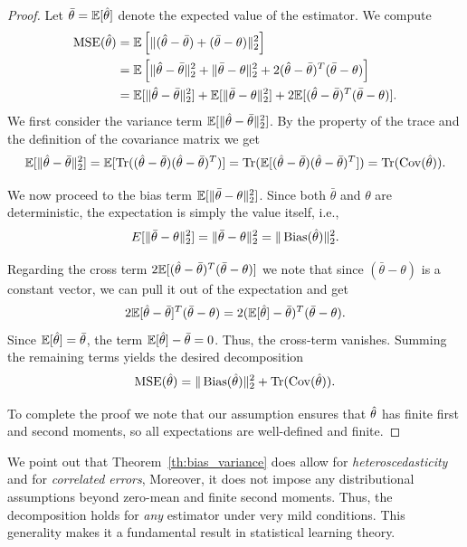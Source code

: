 \begin{proof}
Let $\bar{\theta} = \mathbb{E}[\hat{\theta}]$ denote the expected value of the estimator. We compute
\begin{align*}
\operatorname{MSE}(\hat{\theta}) & = \mathbb{E} \left[ \| (\hat{\theta} - \bar{\theta}) + (\bar{\theta} - \theta) \|_2^2 \right] \\ & = \mathbb{E} \left[ \|\hat{\theta} - \bar{\theta}\|_2^2 + \|\bar{\theta} - \theta\|_2^2 + 2(\hat{\theta} - \bar{\theta})^T (\bar{\theta} - \theta) \right]\\
 & = \mathbb{E} [ \|\hat{\theta} - \bar{\theta}\|_2^2 ] + \mathbb{E} [ \|\bar{\theta} - \theta\|_2^2 ] + 2\mathbb{E} [ (\hat{\theta} - \bar{\theta})^T (\bar{\theta} - \theta) ].
\end{align*}
We first consider the variance term $\mathbb{E} [ \|\hat{\theta} - \bar{\theta}\|_2^2 ]$.
By the property of the trace and the definition of the covariance matrix we get
$$\mathbb{E} [ \|\hat{\theta} - \bar{\theta}\|_2^2 ] = \mathbb{E} [ \operatorname{Tr}((\hat{\theta} - \bar{\theta})(\hat{\theta} - \bar{\theta})^T) ] = \operatorname{Tr}(\mathbb{E} [ (\hat{\theta} - \bar{\theta})(\hat{\theta} - \bar{\theta})^T ]) = \operatorname{Tr}(\operatorname{Cov}(\hat{\theta})).$$


We now proceed to the bias term $\mathbb{E} [ \|\bar{\theta} - \theta\|_2^2 ]$.
Since both $\bar{\theta}$ and $\theta$ are deterministic, the expectation is simply the value itself, i.e.,
$$E [ \|\bar{\theta} - \theta\|_2^2 ] = \|\bar{\theta} - \theta\|_2^2 = \|\operatorname{Bias}(\hat{\theta})\|_2^2.$$

Regarding the cross term $2\mathbb{E} [ (\hat{\theta} - \bar{\theta})^T (\bar{\theta} - \theta) ]$ we note that since $(\bar{\theta} - \theta)$ is a constant vector, we can pull it out of the expectation and get
$$2\mathbb{E} [ \hat{\theta} - \bar{\theta} ]^T (\bar{\theta} - \theta) = 2(\mathbb{E}[\hat{\theta}] - \bar{\theta})^T (\bar{\theta} - \theta).$$
Since $\mathbb{E}[\hat{\theta}] = \bar{\theta}$, the term $\mathbb{E}[\hat{\theta}] - \bar{\theta} = 0$. Thus, the cross-term vanishes.
Summing the remaining terms yields the desired decomposition
$$\operatorname{MSE}(\hat{\theta}) = \|\operatorname{Bias}(\hat{\theta})\|_2^2 + \operatorname{Tr}(\operatorname{Cov}(\hat{\theta})).$$

To complete the proof we note that our assumption ensures that $\hat{\theta}$ has finite first and second moments, 
so all expectations are well-defined and finite.
\end{proof}


We point out that Theorem~\ref{th:bias_variance} does allow for {\em heteroscedasticity} and for {\em correlated errors}, Moreover, it does not impose 
any distributional assumptions beyond zero-mean and finite second moments. Thus, the decomposition holds for \emph{any} estimator under very mild conditions. This 
generality makes it a fundamental result in statistical learning theory.



